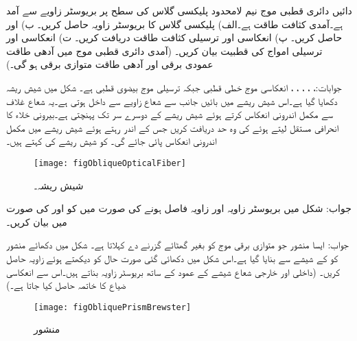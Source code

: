 \newpage
{}

دائیں دائری قطبی موج  نیم لامحدود پلیکسی گلاس   کی سطح پر بریوسٹر زاویے سے آمد ہے۔آمدی کثافت طاقت  ہے۔الف) پلیکسی گلاس کا بریوسٹر زاویہ حاصل کریں۔ ب)  اور  حاصل کریں۔ پ) انعکاسی اور ترسیلی کثافت طاقت دریافت کریں۔ ت) انعکاسی اور ترسیلی امواج کی قطبیت بیان کریں۔ (آمدی دائری قطبی موج میں آدھی طاقت عمودی برقی اور آدھی طاقت متوازی برقی ہو گی۔)

جوابات:، ، ، ، ، انعکاسی موج خطی قطبی جبکہ ترسیلی موج بیضوی قطبی ہے۔
شکل  میں شیش ریشہ دکھایا گیا ہے۔اس شیش ریشے میں بائیں جانب سے شعاع  زاویے سے داخل ہوتی ہے۔یہ شعاع غلاف سے مکمل اندرونی انعکاس کرتے ہوئے شیش ریشے کے دوسرے سر تک پہنچتی ہے۔بیرونی خلاء کا انحرافی مستقل  لیتے ہوئے  کی وہ حد دریافت کریں جس کے اندر رہتے ہوئے  شیش ریشے میں مکمل اندرونی انعکاس پائی جائے گی۔ کو شیش ریشے کی  کہتے ہیں۔   
\begin{figure}
\centering
\texttt{[image: figObliqueOpticalFiber]}
\caption{شیش ریشہ۔}
\label{شکل_ترچھی_شیش_ریشہ}
\end{figure}

جواب:
شکل  میں  بریوسٹر زاویہ اور  زاویہ فاصل ہونے کی صورت میں  کو  اور  کی صورت میں بیان کریں۔

جواب:
ایسا منشور جو  متوازی برقی موج کو بغیر گھٹائے گزرنے دے  کہلاتا ہے۔ شکل  میں دکھائے منشور کو  کے شیشے سے بنایا گیا ہے۔اس شکل میں دکھائی گئی صورت حال کو دیکھتے ہوئے زاویہ  حاصل کریں۔ (داخلی اور خارجی شعاع شیشے کے عمود کے ساتھ بریوسٹر زاویہ بناتے ہیں۔اس سے انعکاسی ضیاع کا خاتمہ حاصل کیا جاتا ہے۔)
\begin{figure}
\centering
\texttt{[image: figObliquePrismBrewster]}
\caption{منشور}
\label{شکل_ترچھی_منشور}
\end{figure}

